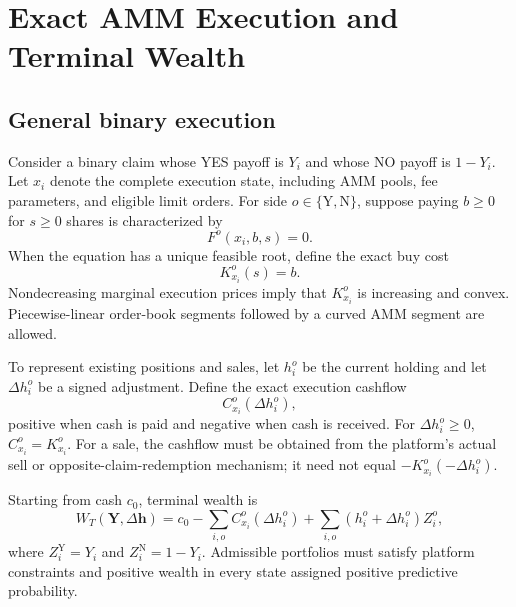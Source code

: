 \documentclass[journal,a4paper]{IEEEtran}
\begin{document}
\section{Exact AMM Execution and Terminal Wealth}
\subsection{General binary execution}
Consider a binary claim whose YES payoff is $Y_i$ and whose NO payoff is $1-Y_i$. Let $x_i$ denote the complete execution state, including AMM pools, fee parameters, and eligible limit orders. For side $o\in\{\mathrm{Y},\mathrm{N}\}$, suppose paying $b\geq0$ for $s\geq0$ shares is characterized by
\begin{equation}
F^o(x_i,b,s)=0.
\label{eq:general-fill}
\end{equation}
When the equation has a unique feasible root, define the exact buy cost
\begin{equation}
K_{x_i}^{o}(s)=b.
\label{eq:buy-cost}
\end{equation}
Nondecreasing marginal execution prices imply that $K_{x_i}^{o}$ is increasing and convex. Piecewise-linear order-book segments followed by a curved AMM segment are allowed.

To represent existing positions and sales, let $h_i^o$ be the current holding and let $\Delta h_i^o$ be a signed adjustment. Define the exact execution cashflow
\begin{equation}
C_{x_i}^{o}(\Delta h_i^o),
\label{eq:signed-cashflow}
\end{equation}
positive when cash is paid and negative when cash is received. For $\Delta h_i^o\geq0$, $C_{x_i}^{o}=K_{x_i}^{o}$. For a sale, the cashflow must be obtained from the platform's actual sell or opposite-claim-redemption mechanism; it need not equal $-K_{x_i}^{o}(-\Delta h_i^o)$.

Starting from cash $c_0$, terminal wealth is
\begin{equation}
W_T(\boldsymbol{Y},\Delta\boldsymbol{h})
=
c_0-
\sum_{i,o}C_{x_i}^{o}(\Delta h_i^o)
+
\sum_{i,o}(h_i^o+\Delta h_i^o)Z_i^o,
\label{eq:terminal-wealth}
\end{equation}
where $Z_i^{\mathrm{Y}}=Y_i$ and $Z_i^{\mathrm{N}}=1-Y_i$. Admissible portfolios must satisfy platform constraints and positive wealth in every state assigned positive predictive probability.
\end{document}
